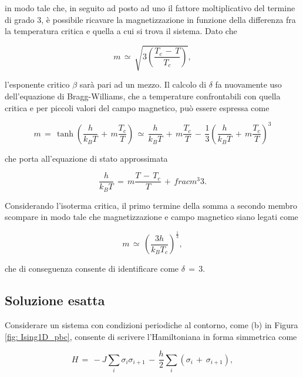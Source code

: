 in modo tale che, in seguito ad posto ad uno il fattore moltiplicativo del termine di grado 3, è possibile ricavare la 
magnetizzazione in funzione della differenza fra la temperatura critica e quella a cui si trova il sistema. Dato che 

\begin{equation}
    m\,\simeq\,\sqrt{3\left(\frac{T_c\,-\,T}{T_c}\right)}, 
    \label{eq: beta_sp_Ising1D_MF}
\end{equation}

l'esponente critico $\beta$ sarà pari ad un mezzo. Il calcolo di $\delta$ fa nuovamente uso dell'equazione di Bragg-Williams, che 
a temperature confrontabili con quella critica e per piccoli valori del campo magnetico, può essere espressa come 

\begin{equation}
    m\,=\,\tanh{\left(\frac{h}{k_BT}\,+\,m\frac{T_c}{T}\right)}\,\simeq\,\frac{h}{k_B T}\,+\,m\frac{T_c}{T}\,-\,\frac{1}{3}\left(\frac{h}{k_B T}\,+\,m\frac{T_c}{T}\right)^3
    \label{eq: delta_fp_Ising1D_MF}
\end{equation}

che porta all'equazione di stato approssimata 

\begin{equation}
    \frac{h}{k_B T}\,=\,m\frac{T\,-\,T_c}{T}\,+\,frac{m^3}{3}.
    \label{eq: beta_sp_Ising1D_MF}
\end{equation}

Considerando l'isoterma critica, il primo termine della somma a secondo membro scompare in modo tale che magnetizzazione e 
campo magnetico siano legati come 

\begin{equation}
    m\,\simeq\,\left(\frac{3h}{k_B T_c}\right)^{\frac{1}{3}},
    \label{eq: beta_tp_Ising1D_MF}
\end{equation}

che di conseguenza consente di identificare come $\delta\,=\,3$.





\subsection{Soluzione esatta}

Considerare un sistema con condizioni periodiche al contorno, come (b) in Figura \ref{fig: Ising1D_pbc}, consente 
di scrivere l'Hamiltoniana in forma simmetrica come 

\begin{equation}
    H\,=\,-J\sum_{i} \sigma_i \sigma_{i+1}\,-\,\frac{h}{2}\sum_{i} \left(\sigma_i\,+\,\sigma_{i+1}\right),
    \label{eq: ising_ham_sim}
\end{equation}

